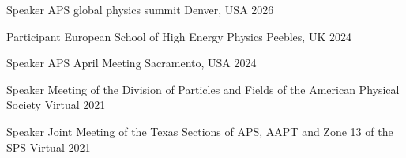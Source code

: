 
\begin{cvhonors}
  \cvhonor
    {Speaker} %
    {APS global physics summit} %
    {Denver, USA} %
    {2026} %

  \cvhonor
    {Participant} %
    {European School of High Energy Physics} %
    {Peebles, UK} %
    {2024} %


  \cvhonor
    {Speaker} %
    {APS April Meeting} %
    {Sacramento, USA} %
    {2024} %


  \cvhonor
    {Speaker} %
    {Meeting of the Division of Particles and Fields of the American Physical Society} %
    {Virtual} %
    {2021} %

  \cvhonor
    {Speaker} %
    {Joint Meeting of the Texas Sections of APS, AAPT and Zone 13 of the SPS} %
    {Virtual} %
    {2021} %
\end{cvhonors}





